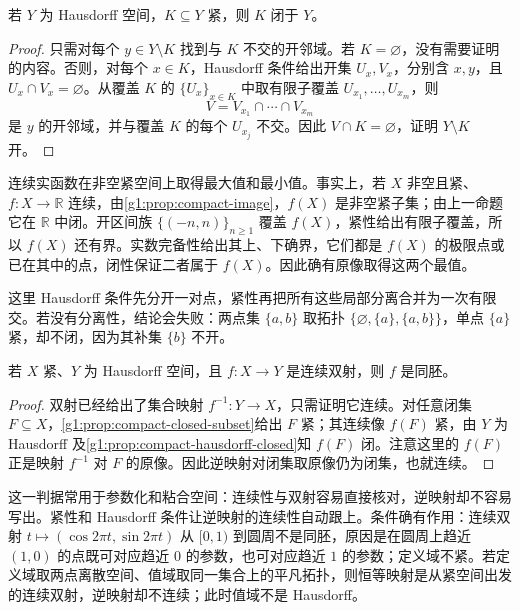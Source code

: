 \begin{proposition}\label{g1:prop:compact-hausdorff-closed}
	若 \(Y\) 为 Hausdorff 空间，\(K\subseteq Y\) 紧，则 \(K\) 闭于 \(Y\)。
\end{proposition}
\begin{proof}
	只需对每个 \(y\in Y\setminus K\) 找到与 \(K\) 不交的开邻域。若 \(K=\varnothing\)，没有需要证明的内容。否则，对每个 \(x\in K\)，Hausdorff 条件给出开集 \(U_x,V_x\)，分别含 \(x,y\)，且 \(U_x\cap V_x=\varnothing\)。从覆盖 \(K\) 的 \(\{U_x\}_{x\in K}\) 中取有限子覆盖 \(U_{x_1},\ldots,U_{x_m}\)，则
	\[
		V=V_{x_1}\cap\cdots\cap V_{x_m}
	\]
	是 \(y\) 的开邻域，并与覆盖 \(K\) 的每个 \(U_{x_j}\) 不交。因此 \(V\cap K=\varnothing\)，证明 \(Y\setminus K\) 开。
\end{proof}

连续实函数在非空紧空间上取得最大值和最小值。事实上，若 \(X\) 非空且紧、\(f:X\rightarrow\mathbb R\) 连续，由\cref{g1:prop:compact-image}，\(f(X)\) 是非空紧子集；由上一命题它在 \(\mathbb R\) 中闭。开区间族 \(\{(-n,n)\}_{n\ge1}\) 覆盖 \(f(X)\)，紧性给出有限子覆盖，所以 \(f(X)\) 还有界。实数完备性给出其上、下确界，它们都是 \(f(X)\) 的极限点或已在其中的点，闭性保证二者属于 \(f(X)\)。因此确有原像取得这两个最值。

这里 Hausdorff 条件先分开一对点，紧性再把所有这些局部分离合并为一次有限交。若没有分离性，结论会失败：两点集 \(\{a,b\}\) 取拓扑 \(\{\varnothing,\{a\},\{a,b\}\}\)，单点 \(\{a\}\) 紧，却不闭，因为其补集 \(\{b\}\) 不开。

\begin{theorem}\label{g1:thm:compact-bijection}
	若 \(X\) 紧、\(Y\) 为 Hausdorff 空间，且 \(f:X\to Y\) 是连续双射，则 \(f\) 是同胚。
\end{theorem}
\begin{proof}
	双射已经给出了集合映射 \(f^{-1}:Y\to X\)，只需证明它连续。对任意闭集 \(F\subseteq X\)，\cref{g1:prop:compact-closed-subset}给出 \(F\) 紧；其连续像 \(f(F)\) 紧，由 \(Y\) 为 Hausdorff 及\cref{g1:prop:compact-hausdorff-closed}知 \(f(F)\) 闭。注意这里的 \(f(F)\) 正是映射 \(f^{-1}\) 对 \(F\) 的原像。因此逆映射对闭集取原像仍为闭集，也就连续。
\end{proof}

这一判据常用于参数化和粘合空间：连续性与双射容易直接核对，逆映射却不容易写出。紧性和 Hausdorff 条件让逆映射的连续性自动跟上。条件确有作用：连续双射 \(t\mapsto(\cos2\pi t,\sin2\pi t)\) 从 \([0,1)\) 到圆周不是同胚，原因是在圆周上趋近 \((1,0)\) 的点既可对应趋近 \(0\) 的参数，也可对应趋近 \(1\) 的参数；定义域不紧。若定义域取两点离散空间、值域取同一集合上的平凡拓扑，则恒等映射是从紧空间出发的连续双射，逆映射却不连续；此时值域不是 Hausdorff。


